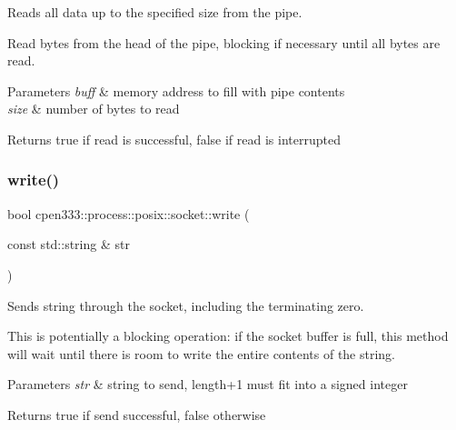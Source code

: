 Reads all data up to the specified size from the pipe. 

Read bytes from the head of the pipe, blocking if necessary until all bytes are read.


\begin{DoxyParams}{Parameters}
{\em buff} & memory address to fill with pipe contents \\
\hline
{\em size} & number of bytes to read \\
\hline
\end{DoxyParams}
\begin{DoxyReturn}{Returns}
true if read is successful, false if read is interrupted 
\end{DoxyReturn}
\mbox{\label{classcpen333_1_1process_1_1posix_1_1socket_a80d3d77a066ebc082196bb2182021818}} 
\subsubsection{\texorpdfstring{write()}{write()}\hspace{0.1cm}{\footnotesize\ttfamily [1/2]}}
{\footnotesize\ttfamily bool cpen333\+::process\+::posix\+::socket\+::write (\begin{DoxyParamCaption}\item[{const std\+::string \&}]{str }\end{DoxyParamCaption})\hspace{0.3cm}{\ttfamily [inline]}}



Sends string through the socket, including the terminating zero. 

This is potentially a blocking operation\+: if the socket buffer is full, this method will wait until there is room to write the entire contents of the string.


\begin{DoxyParams}{Parameters}
{\em str} & string to send, length+1 must fit into a signed integer \\
\hline
\end{DoxyParams}
\begin{DoxyReturn}{Returns}
true if send successful, false otherwise 
\end{DoxyReturn}
\mbox{\label{classcpen333_1_1process_1_1posix_1_1socket_a60ba24c07c24cfb34ef77b0f137cfc32}} 
